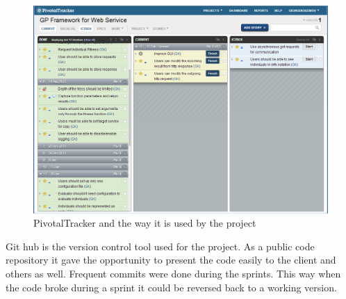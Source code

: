 \begin{figure}[htp]
\centering
\includegraphics[scale=0.5]{Figures/pivotalTracker.png}
\caption{PivotalTracker and the way it is used by the project}
\label{fig:pivotalTracker}
\end{figure}

Git hub is the version control tool used for the project. As a public code repository it gave the opportunity to present the code easily to the client and
others as well. Frequent commits were done during the sprints. This way when the code broke during a sprint it could be reversed back to a working version.

